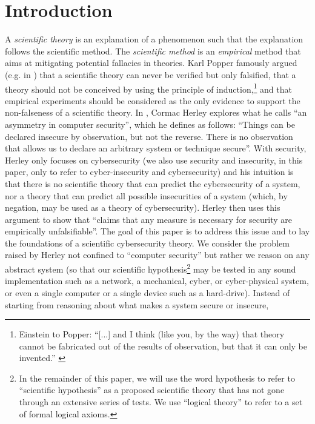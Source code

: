 \documentclass[runningheads]{llncs}
\begin{document}
\section{Introduction}\label{sec:intro}
A \emph{scientific theory} is an explanation of a phenomenon such that the
explanation follows the scientific method. The \emph{scientific method} is an
\emph{empirical} method that aims at mitigating potential fallacies in
theories.  Karl Popper famously argued (e.g. in \autocite{Popper1959logic})
that a scientific theory can never be verified but only falsified, that a
theory should not be conceived by using the principle of
induction,\footnote{Einstein to Popper: ``[...] and I think (like
you, by the way) that theory cannot be fabricated out of the results of
observation, but that it can only be invented.'' \autocite{Popper1959logic}}
and that empirical experiments should be considered as the only evidence to
support the non-falseness of a scientific theory. 
In \autocite{Herley2016unfalsifiability}, Cormac Herley explores what he calls
``an asymmetry in computer security'', which he defines as follows: ``Things
can be declared insecure by observation, but not the reverse. There is no
observation that allows us to declare an arbitrary system or technique
secure''. With security, Herley only focuses on cybersecurity (we also use
security and insecurity, in this paper, only to refer to cyber-insecurity and
cybersecurity) and his intuition is that there is no scientific theory that can
predict the cybersecurity of a system, nor a theory that can predict all
possible insecurities of a system (which, by negation, may be used as a theory
of cybersecurity).  Herley then uses this argument to show that ``claims that
any measure is necessary for security are empirically unfalsifiable''. 
The goal of this paper is to address this issue and to lay the foundations of a scientific cybersecurity
theory.  We consider the problem raised by Herley not confined to ``computer
security'' but rather we reason on any abstract system (so that our scientific
hypothesis\footnote{In the remainder of this paper, we will use the word
hypothesis to refer to ``scientific hypothesis'' as a proposed scientific
theory that has not gone through an extensive series of tests. We
use ``logical theory'' to refer to a set of formal logical axioms.} may
be tested in any sound implementation such as a network, a mechanical, cyber, or
cyber-physical system, or even a single computer or a single device such as a
hard-drive).  
Instead of starting from reasoning about what makes a system secure or insecure,
\end{document}
